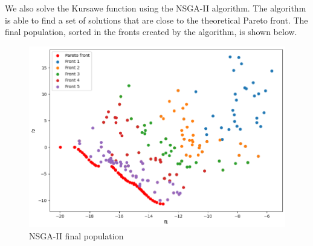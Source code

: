 We also solve the Kursawe function using the NSGA-II algorithm. The algorithm is able to find a set of solutions that are close to the theoretical Pareto front. The final population, sorted in the fronts created by the algorithm, is shown below.
\begin{figure}
    \centering
    \includegraphics[width=\textwidth]{lab8/imgs/kursawe_nsga.png}
    \caption{NSGA-II final population}
\end{figure}



